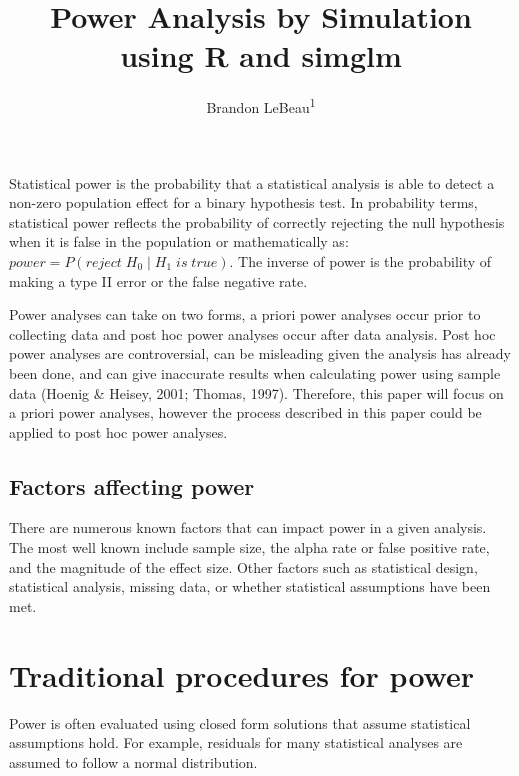 \documentclass[man,mask,floatsintext]{apa6}
\title{Power Analysis by Simulation using R and simglm}
\author{Brandon LeBeau\textsuperscript{1}}
\date{}
\affiliation{
\vspace{0.5cm}
\textsuperscript{1} University of Iowa}
\begin{document}
\maketitle

Statistical power is the probability that a statistical analysis is able to detect a non-zero population effect for a binary hypothesis test. In probability terms, statistical power reflects the probability of correctly rejecting the null hypothesis when it is false in the population or mathematically as: \(power = P(reject \; H_{0} \; | \; H_{1} \; is \; true)\). The inverse of power is the probability of making a type II error or the false negative rate.

Power analyses can take on two forms, a priori power analyses occur prior to collecting data and post hoc power analyses occur after data analysis. Post hoc power analyses are controversial, can be misleading given the analysis has already been done, and can give inaccurate results when calculating power using sample data (Hoenig \& Heisey, 2001; Thomas, 1997). Therefore, this paper will focus on a priori power analyses, however the process described in this paper could be applied to post hoc power analyses.

\hypertarget{factors-affecting-power}{%
\subsection{Factors affecting power}\label{factors-affecting-power}}

There are numerous known factors that can impact power in a given analysis. The most well known include sample size, the alpha rate or false positive rate, and the magnitude of the effect size. Other factors such as statistical design, statistical analysis, missing data, or whether statistical assumptions have been met.

\hypertarget{traditional-procedures-for-power}{%
\section{Traditional procedures for power}\label{traditional-procedures-for-power}}

Power is often evaluated using closed form solutions that assume statistical assumptions hold. For example, residuals for many statistical analyses are assumed to follow a normal distribution.
\end{document}
